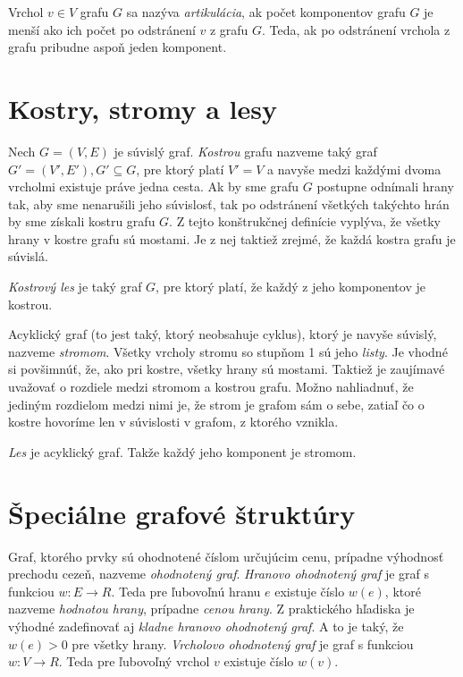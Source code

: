Vrchol $v \in V$ grafu $G$ sa nazýva \textit{artikulácia}, ak počet komponentov grafu $G$ je menší ako ich počet po odstránení $v$ z grafu $G$. Teda, ak po odstránení vrchola z grafu pribudne aspoň jeden komponent.\newline


\section{Kostry, stromy a lesy}

Nech $G = (V, E)$ je súvislý graf. \textit{Kostrou} grafu nazveme taký graf $G' = (V', E'), G'\subseteq G$, pre ktorý platí $V' = V$ a navyše medzi každými dvoma vrcholmi existuje práve jedna cesta. Ak by sme grafu $G$ postupne odnímali hrany tak, aby sme nenarušili jeho súvislosť, tak po odstránení všetkých takýchto hrán by sme získali kostru grafu $G$. Z tejto konštrukčnej definície vyplýva, že všetky hrany v kostre grafu sú mostami. Je z nej taktiež zrejmé, že každá kostra grafu je súvislá.\newline

\textit{Kostrový les} je taký graf $G$, pre ktorý platí, že každý z jeho komponentov je kostrou.\newline

Acyklický graf (to jest taký, ktorý neobsahuje cyklus), ktorý je navyše súvislý, nazveme \textit{stromom}. Všetky vrcholy stromu so stupňom 1 sú jeho \textit{listy}. Je vhodné si povšimnúť, že, ako pri kostre, všetky hrany sú mostami. Taktiež je zaujímavé uvažovať o rozdiele medzi stromom a kostrou grafu. Možno nahliadnuť, že jediným rozdielom medzi nimi je, že strom je grafom sám o sebe, zatiaľ čo o kostre hovoríme len v súvislosti v grafom, z ktorého vznikla.\newline

\textit{Les} je acyklický graf. Takže každý jeho komponent je stromom.\newline


\section{Špeciálne grafové štruktúry}

Graf, ktorého prvky sú ohodnotené číslom určujúcim cenu, prípadne výhodnosť prechodu cezeň, nazveme \textit{ohodnotený graf}. \textit{Hranovo ohodnotený graf} je graf s funkciou $w: E\rightarrow R$. Teda pre ľubovoľnú hranu $e$ existuje číslo $w(e)$, ktoré nazveme \textit{hodnotou hrany}, prípadne \textit{cenou hrany}.  Z praktického hľadiska je výhodné zadefinovať aj \textit{kladne hranovo ohodnotený graf}. A to je taký, že $w(e) > 0$ pre všetky hrany. \textit{Vrcholovo ohodnotený graf} je graf s funkciou $w: V\rightarrow R$. Teda pre ľubovoľný vrchol $v$ existuje číslo $w(v)$. \newline

